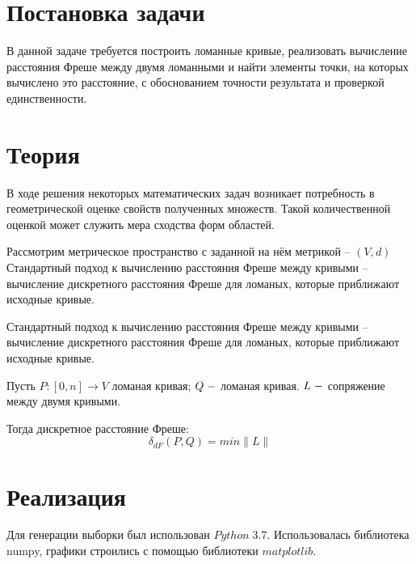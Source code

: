 \documentclass[a4]{article}
\renewcommand{\listoffigures}{\begingroup %
\tocsection
\tocfile{\listfigurename}{lof}
\endgroup}
\begin{document}
\newpage
\pagestyle{plain}



\newpage
\tableofcontents{}
\newpage
\listoffigures{}
\newpage

\section{Постановка задачи}

В данной задаче требуется построить ломанные кривые, реализовать вычисление расстояния Фреше между двумя ломанными и найти элементы точки, на которых вычислено это расстояние, с обоснованием точности результата и проверкой единственности.

\section{Теория}
В ходе решения некоторых математических задач возникает потребность в геометрической оценке свойств полученных множеств. Такой количественной оценкой может служить мера сходства форм областей.

Рассмотрим метрическое пространство с заданной на нём метрикой – $(V,d)$
Стандартный подход к вычислению расстояния Фреше между кривыми – вычисление дискретного расстояния Фреше для ломаных, которые приближают исходные кривые.

Стандартный подход к вычислению расстояния Фреше между кривыми – вычисление дискретного расстояния Фреше для ломаных, которые приближают исходные кривые.

Пусть $P:[0,n]\to V$ ломаная кривая; $Q\; \--$ ломаная кривая.  $L\; \--$ сопряжение между двумя кривыми.

Тогда дискретное расстояние Фреше:
\begin{equation}
    \delta_{dF}(P,Q)=min\|L\|
\end{equation}


\section{Реализация}
Для генерации выборки был использован $Python\;3.7$. Использовалась библиотека numpy, графики строились с помощью библиотеки $matplotlib.$
\end{document}
